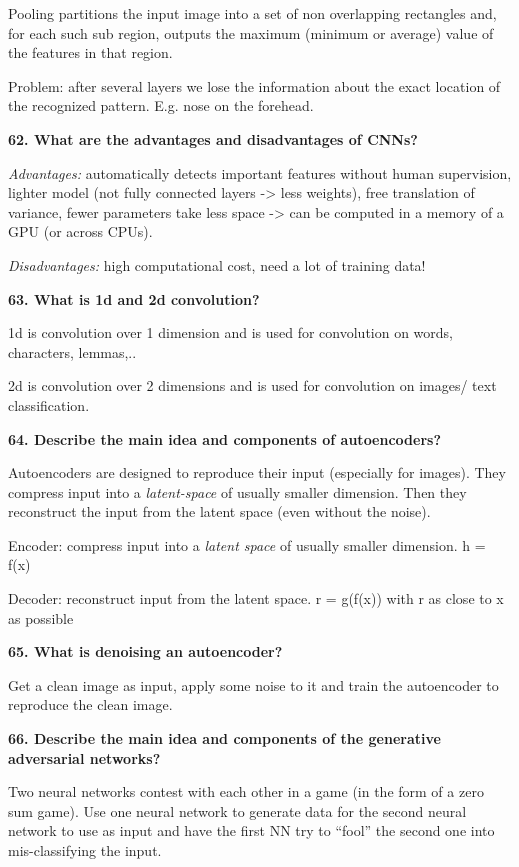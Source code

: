 Pooling partitions the input image into a set of non overlapping
rectangles and, for each such sub region, outputs the maximum (minimum
or average) value of the features in that region.

Problem: after several layers we lose the information about the exact
location of the recognized pattern. E.g. nose on the forehead.

\textbf{62. What are the advantages and disadvantages of CNNs?}

\textit{Advantages:} automatically detects important features without
human supervision, lighter model (not fully connected layers
-\textgreater{} less weights), free translation of variance, fewer
parameters take less space -\textgreater{} can be computed in a memory
of a GPU (or across CPUs).

\textit{Disadvantages:} high computational cost, need a lot of
training data!

\textbf{63. What is 1d and 2d convolution?}

1d is convolution over 1 dimension and is used for convolution on words,
characters, lemmas,..

2d is convolution over 2 dimensions and is used for convolution on
images/ text classification.

\textbf{64. Describe the main idea and components of autoencoders?}

Autoencoders are designed to reproduce their input (especially for
images). They compress input into a \emph{latent-space} of usually
smaller dimension. Then they reconstruct the input from the latent space
(even without the noise).

Encoder: compress input into a \emph{latent space} of usually smaller
dimension. h = f(x)

Decoder: reconstruct input from the latent space. r = g(f(x)) with r as
close to x as possible

\textbf{65. What is denoising an autoencoder?}

Get a clean image as input, apply some noise to it and train the
autoencoder to reproduce the clean image.

\textbf{66. Describe the main idea and components of the generative
adversarial networks?}

Two neural networks contest with each other in a game (in the form of a
zero sum game). Use one neural network to generate data for the second
neural network to use as input and have the first NN try to ``fool'' the
second one into mis-classifying the input.

